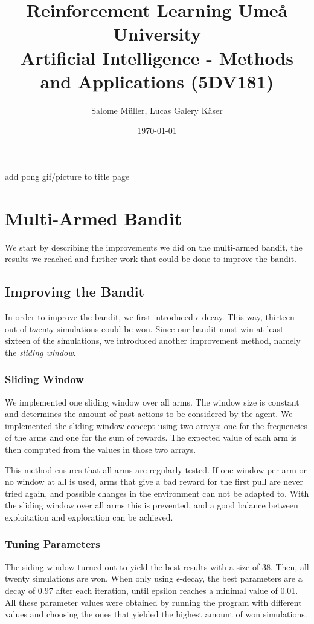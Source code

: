 \documentclass[10pt]{article}
\title{
    Reinforcement Learning
    \vspace{3em}
    {\large Umeå University \\
    Artificial Intelligence - Methods and Applications (5DV181)}
    \vspace{3em}
}
\author{Salome Müller, Lucas Galery Käser}
\date{\today}
\newcommand{\todo}[1]{{\color{red}#1}}
\begin{document}
\maketitle

\todo{add pong gif/picture to title page}

\pagebreak

\section{Multi-Armed Bandit}\label{sec:mab}
We start by describing the improvements we did on the multi-armed bandit, the results we reached and further work that could be done to improve the bandit.

\subsection{Improving the Bandit}\label{subsec:improving-the-bandit}
In order to improve the bandit, we first introduced $\epsilon$-decay.
This way, thirteen out of twenty simulations could be won.
Since our bandit must win at least sixteen of the simulations, we introduced another improvement method, namely the \textit{sliding window}.

\subsubsection{Sliding Window}
We implemented one sliding window over all arms.
The window size is constant and determines the amount of past actions to be considered by the agent.
We implemented the sliding window concept using two arrays: one for the frequencies of the arms and one for the sum of rewards.
The expected value of each arm is then computed from the values in those two arrays.

This method ensures that all arms are regularly tested.
If one window per arm or no window at all is used, arms that give a bad reward for the first pull are never tried again, and possible changes in the environment can not be adapted to.
With the sliding window over all arms this is prevented, and a good balance between exploitation and exploration can be achieved.

\subsubsection{Tuning Parameters}
The siding window turned out to yield the best results with a size of 38.
Then, all twenty simulations are won.
When only using $\epsilon$-decay, the best parameters are a decay of 0.97 after each iteration, until epsilon reaches a minimal value of 0.01.
All these parameter values were obtained by running the program with different values and choosing the ones that yielded the highest amount of won simulations.
\end{document}
